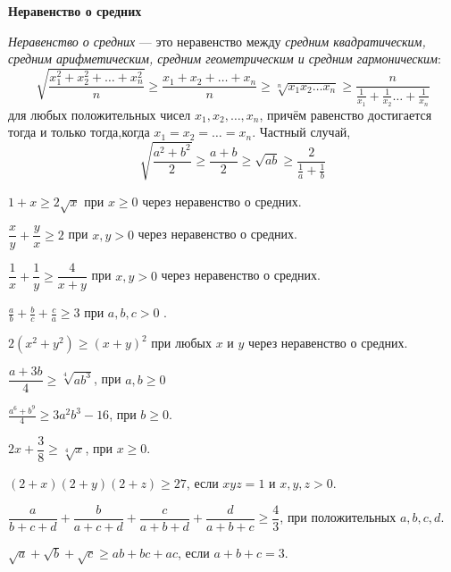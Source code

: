 \documentclass{article}
\begin{document}
    \large

    \begin{center}
        \textbf{Неравенство о средних}
    \end{center}


    \textit{Неравенство о средних} — это неравенство между \textit{средним квадратическим, средним арифметическим, средним геометрическим и средним гармоническим}:
    \[\sqrt{\frac{x_1^2+x_2^2+\dots+x_n^2}{n}}\ge\frac{x_1+x_2+\dots+x_n}{n}\ge\sqrt[n]{x_{1}x_2\dots x_n}\ge \dfrac{n}{\frac{1}{x_1}+\frac{1}{x_2}\dots+\frac{1}{x_n}}\]для любых положительных чисел $x_1, x_2, \dots , x_n$, причём равенство достигается тогда и только
    тогда,когда $x_1 =x_2 =\dotsc=x_n$.
    Частный случай,
    \[\sqrt{\dfrac{a^2 + b^2}{2}} \ge \dfrac{a+b}{2} \ge \sqrt{ab} \ge \dfrac{2}{\frac{1}{a}+\frac{1}{b}}\]

    \begin{enumerate_boxed}

        \item $1+x\ge 2\sqrt{x}$ при $x \geqslant 0$ через неравенство о средних.

        \item $\dfrac{x}{y} + \dfrac{y}{x} \geqslant 2$  при $x, y > 0$ через неравенство о средних.

        \item $\dfrac{1}{x}+\dfrac{1}{y}\geqslant\dfrac{4}{x+y}$ при $x, y > 0$ через неравенство о средних.

        \item $\displaystyle \frac{a}{b} + \frac{b}{c} + \frac{c}{a} \geq 3$ при $a, b, c > 0$ .

        \item $2(x^2 + y^2) \geqslant (x + y)^2$ при любых $x$ и $y$ через неравенство о средних.

        \item $\dfrac{a+3b}{4}\geqslant \sqrt[4]{ab^3}$, при $a, b \geqslant 0$

        \item $\displaystyle \frac{a^6 + b^9}{4}\geqslant 3a^{2}b^3-16$, при $b \geqslant 0$.

        \item $2x + \dfrac{3}{8} \geqslant \sqrt[4]{x}$, при $x \geqslant 0$.

        \item $(2+x)(2+y)(2+z) \geqslant 27$, если $xyz = 1$ и $x, y, z > 0$.

        \item $\dfrac{a}{b + c + d} + \dfrac{b}{a + c + d} + \dfrac{c}{a + b + d} + \dfrac{d}{a + b + c} \geqslant \dfrac{4}{3}$, при положительных $a, b, c, d$.

        \item $\sqrt{a}+\sqrt{b}+\sqrt{c}\geqslant ab+bc+ac$, если $a+b+c = 3$.

    \end{enumerate_boxed}
\end{document}
